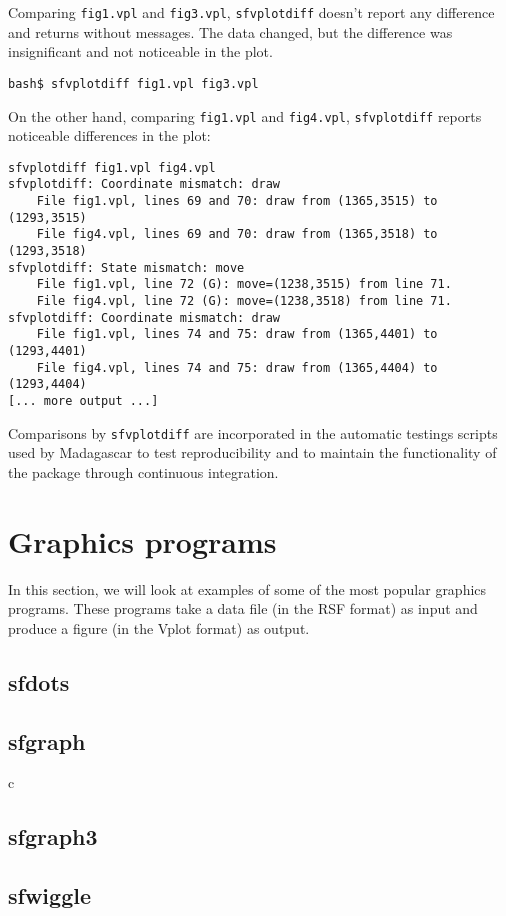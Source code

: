 Comparing \texttt{fig1.vpl} and \texttt{fig3.vpl},
\texttt{sfvplotdiff} doesn't report any difference and returns without
messages. The data changed, but the difference was insignificant and
not noticeable in the plot.
\begin{verbatim}
bash$ sfvplotdiff fig1.vpl fig3.vpl
\end{verbatim}
On the other hand, comparing \texttt{fig1.vpl} and \texttt{fig4.vpl},
\texttt{sfvplotdiff} reports noticeable differences in the plot:
\begin{verbatim}
sfvplotdiff fig1.vpl fig4.vpl
sfvplotdiff: Coordinate mismatch: draw
	File fig1.vpl, lines 69 and 70: draw from (1365,3515) to (1293,3515)
	File fig4.vpl, lines 69 and 70: draw from (1365,3518) to (1293,3518)
sfvplotdiff: State mismatch: move
	File fig1.vpl, line 72 (G): move=(1238,3515) from line 71.
	File fig4.vpl, line 72 (G): move=(1238,3518) from line 71.
sfvplotdiff: Coordinate mismatch: draw
	File fig1.vpl, lines 74 and 75: draw from (1365,4401) to (1293,4401)
	File fig4.vpl, lines 74 and 75: draw from (1365,4404) to (1293,4404)
[... more output ...]
\end{verbatim}

Comparisons by \texttt{sfvplotdiff} are incorporated in the automatic
testings scripts used by Madagascar to test reproducibility and to
maintain the functionality of the package through continuous integration.

\section{Graphics programs}

In this section, we will look at examples of some of the most popular
graphics programs. These programs take a data file (in the RSF format)
as input and produce a figure (in the Vplot format) as output.

\subsection{sfdots}

\subsection{sfgraph}
c
\subsection{sfgraph3}

\subsection{sfwiggle}

